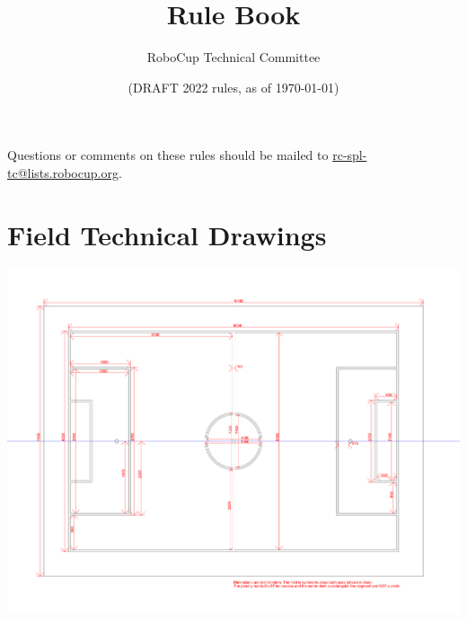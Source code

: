 \documentclass[12pt]{article}
\title{\leaguename Rule Book}
\author{RoboCup Technical Committee}
\date{(DRAFT 2022 rules, as of \today)}
\begin{document}
\maketitle

\begin{center}
Questions or comments on these rules should be mailed to \url{rc-spl-tc@lists.robocup.org}.
\end{center}

\newpage

\tableofcontents
\setcounter{tocdepth}{3}

\thispagestyle{fancy}

\clearpage

\cfoot{\thepage}
\setcounter{page}{1}

\newpage


\newpage


\newpage


\newpage


\newpage


\newpage


\appendix


\newpage


\newpage



\section{Field Technical Drawings}
\label{apx:technical-drawing}
\centerline{\includegraphics[angle=90,origin=c,width=\columnwidth]{figs/fieldDimensions2020_technical.pdf}}
\end{document}
